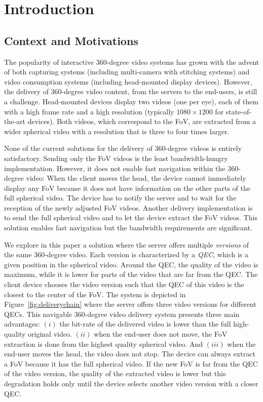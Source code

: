 \section{Introduction}
\label{sec:introduction}

\subsection{Context and Motivations}

The popularity of interactive 360-degree video systems 
has grown with the advent of both capturing systems
(including multi-camera with stitching systems) and video
consumption systems (including head-mounted display devices).
However, the delivery of 360-degree video content, from the servers
to the end-users,
is still a challenge. Head-mounted devices display two videos (one per
eye), each of them with a high frame rate and a high resolution (typically 
$1080\times 1200$ for state-of-the-art devices). Both videos, which 
correspond to the \ac{FoV}, are extracted
from a wider spherical video with a resolution that is three to four times larger.

None of the current solutions for the delivery of 360-degree videos is entirely 
satisfactory. Sending only 
the \ac{FoV} videos is the least bandwidth-hungry implementation. However, it does 
not enable fast
navigation within the 360-degree video: When the client moves the head, the device cannot 
immediately display any \ac{FoV} because it does not have information on the other
parts of the full spherical video. The device has to notify the server and to wait 
for the reception of the 
newly adjusted \ac{FoV} videos. Another delivery implementation is to send the full spherical video 
and to let the device
extract the \ac{FoV} videos. This solution enables fast navigation but the bandwidth requirements are 
significant.

We explore in this paper a solution where the server offers multiple \emph{versions} of the same 
360-degree video. Each version is characterized by a \emph{\ac{QEC}}, which is a given 
position in the spherical video. Around the \ac{QEC}, the quality of the video is maximum,
 while it is lower for parts of the video that are far from the \ac{QEC}.
The client device chooses the video version
such that  
the \ac{QEC} of this video is the closest to the center of the \ac{FoV}.
The system is depicted in Figure~\ref{fig:deliverychain} where the server offers
three video versions for different \acp{QEC}.
This navigable 360-degree video delivery system presents three main advantages:
$(i)$ the bit-rate of the delivered video is lower than the full high-quality original video.
$(ii)$ when the end-user does not move, the \ac{FoV} extraction is done from the highest 
quality spherical video.
And $(iii)$ when the end-user moves the head, the video does not stop. The device can 
always extract 
a \ac{FoV} because it has the full spherical video. If the new \ac{FoV} is far from the 
\ac{QEC} of the video version, the quality of the extracted video is lower but this
degradation holds only until the 
device selects another video version with a closer \ac{QEC}.

